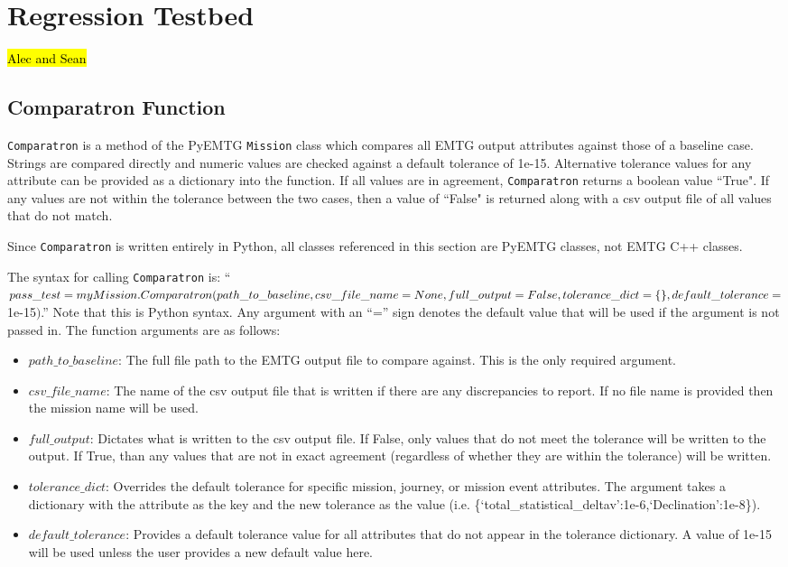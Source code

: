 \chapter{Regression Testbed}
\label{chap:testing}

\hl{Alec and Sean}

\section{Comparatron Function}
\label{sec:comparatronfunction}

\texttt{Comparatron} is a method of the PyEMTG \texttt{Mission} class which compares all EMTG output attributes against those of a baseline case. Strings are compared directly and numeric values are checked against a default tolerance of 1e-15. Alternative tolerance values for any attribute can be provided as a dictionary into the function. If all values are in agreement, \texttt{Comparatron} returns a boolean value ``True". If any values are not within the tolerance between the two cases, then a value of ``False" is returned along with a csv output file of all values that do not match.

Since \texttt{Comparatron} is written entirely in Python, all classes referenced in this section are PyEMTG classes, not EMTG C++ classes.

The syntax for calling \texttt{Comparatron} is: ``$pass\_test=myMission.Comparatron(path\_to\_baseline,\linebreak csv\_file\_name=None,full\_output=False,tolerance\_dict=\{\},default\_tolerance=$1e-15$)$.'' Note that this is Python syntax. Any argument with an ``='' sign denotes the default value that will be used if the argument is not passed in. The function arguments are as follows:
\begin{itemize}[label=$\bullet$]
	\item $path\_to\_baseline$: The full file path to the EMTG output file to compare against. This is the only required argument.
	\item $csv\_file\_name$: The name of the csv output file that is written if there are any discrepancies to report. If no file name is provided then the mission name will be used.
	\item $full\_output$: Dictates what is written to the csv output file. If False, only values that do not meet the tolerance will be written to the output. If True, than any values that are not in exact agreement (regardless of whether they are within the tolerance) will be written. 
	\item $tolerance\_dict$: Overrides the default tolerance for specific mission, journey, or mission event attributes. The argument takes a dictionary with the attribute as the key and the new tolerance as the value (i.e. \{`total\_statistical\_deltav':1e-6,`Declination':1e-8\}).
	\item $default\_tolerance$: Provides a default tolerance value for all attributes that do not appear in the tolerance dictionary. A value of 1e-15 will be used unless the user provides a new default value here.
\end{itemize}

